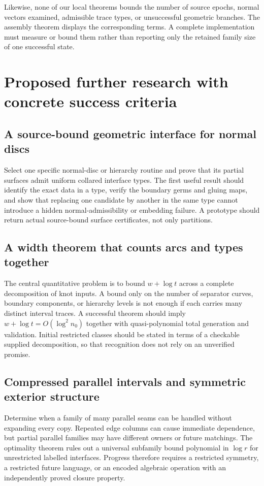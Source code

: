 \documentclass[11pt,a4paper]{article}
\theoremstyle{remark}\newtheorem{remark}[theorem]{Remark}
\begin{document}
Likewise, none of our local theorems bounds the number of source epochs, normal vectors examined, admissible trace types, or unsuccessful geometric branches. The assembly theorem displays the corresponding terms. A complete implementation must measure or bound them rather than reporting only the retained family size of one successful state.

\section{Proposed further research with concrete success criteria}\label{sec:future}
\subsection{A source-bound geometric interface for normal discs}
Select one specific normal-disc or hierarchy routine and prove that its partial surfaces admit uniform collared interface types. The first useful result should identify the exact data in a type, verify the boundary germs and gluing maps, and show that replacing one candidate by another in the same type cannot introduce a hidden normal-admissibility or embedding failure. A prototype should return actual source-bound surface certificates, not only partitions.

\subsection{A width theorem that counts arcs and types together}
The central quantitative problem is to bound $w+\log t$ across a complete decomposition of knot inputs. A bound only on the number of separator curves, boundary components, or hierarchy levels is not enough if each carries many distinct interval traces. A successful theorem should imply $w+\log t=O(\log^2 n_0)$ together with quasi-polynomial total generation and validation. Initial restricted classes should be stated in terms of a checkable supplied decomposition, so that recognition does not rely on an unverified promise.

\subsection{Compressed parallel intervals and symmetric exterior structure}
Determine when a family of many parallel seams can be handled without expanding every copy. Repeated edge columns can cause immediate dependence, but partial parallel families may have different owners or future matchings. The optimality theorem rules out a universal subfamily bound polynomial in $\log r$ for unrestricted labelled interfaces. Progress therefore requires a restricted symmetry, a restricted future language, or an encoded algebraic operation with an independently proved closure property.
\end{document}
